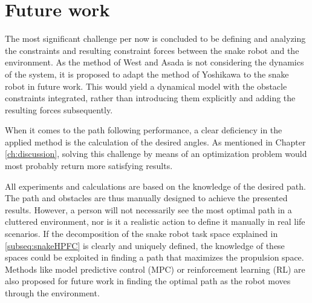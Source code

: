 \section{Future work}

The most significant challenge per now is concluded to be defining and analyzing the constraints and resulting constraint forces between the snake robot and the environment. As the method of West and Asada \cite{west1985method} is not considering the dynamics of the system, it is proposed to adapt the method of Yoshikawa \cite{yoshikawa1987dynamic} to the snake robot in future work. This would yield a dynamical model with the obstacle constraints integrated, rather than introducing them explicitly and adding the resulting forces subsequently.

When it comes to the path following performance, a clear deficiency in the applied method is the calculation of the desired angles. As mentioned in Chapter \ref{ch:discussion}, solving this challenge by means of an optimization problem would most probably return more satisfying results.

All experiments and calculations are based on the knowledge of the desired path. The path and obstacles are thus manually designed to achieve the presented results. However, a person will not necessarily see the most optimal path in a cluttered environment, nor is it a realistic action to define it manually in real life scenarios. 
If the decomposition of the snake robot task space explained in \ref{subseq:snakeHPFC} is clearly and uniquely defined, the knowledge of these spaces could be exploited in finding a path that maximizes the propulsion space.
Methods like model predictive control (MPC) or reinforcement learning (RL) are also proposed for future work in finding the optimal path as the robot moves through the environment.

